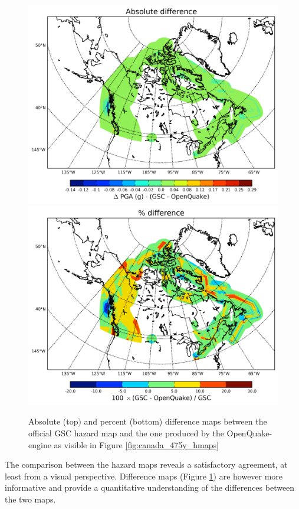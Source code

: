 \begin{figure}
\centering
\includegraphics[width=14cm]{./qareport/pictures/GSC_OQ_PGA_0pt1_abs_diff.pdf}
\includegraphics[width=14cm]{./qareport/pictures/GSC_OQ_PGA_0pt1_percent_diff.pdf}
\caption{Absolute (top) and percent (bottom) difference maps between the official GSC hazard map and the one produced by the OpenQuake-engine as visible in Figure \ref{fig:canada_475y_hmaps}}
\label{fig:canada_475y_dmaps}
\end{figure}
The comparison between the hazard maps reveals a satisfactory agreement, at least from a visual perspective. Difference maps (Figure \ref{fig:canada_475y_dmaps}) are however more informative and provide a quantitative understanding of the differences between the two maps.

